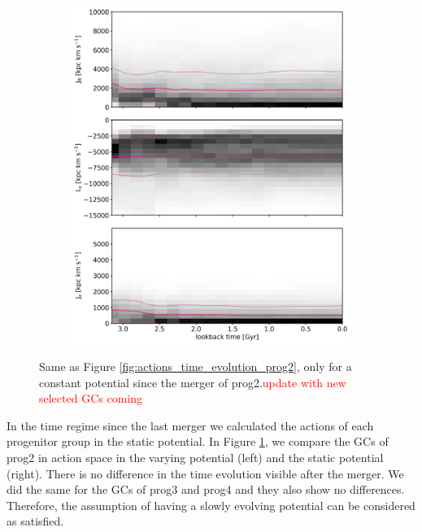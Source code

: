 \begin{figure}[htbp]
\begin{subfigure}[c]{0.48\textwidth}
	    \includegraphics[width=\textwidth]{plots/Dynamics/prog2/action_wodisk_time_evolution_hist_mean_static_pot.png}
    \end{subfigure}
    \caption{Same as Figure \ref{fig:actions_time_evolution_prog2}, only for a constant potential since the merger of prog2.\textcolor{red}{update with new selected GCs coming}}\label{fig:comparison_actions_time_evolution_mean_pot_prog2}
\end{figure}
In the time regime since the last merger we calculated the actions of each progenitor group in the static potential. In Figure \ref{fig:comparison_actions_time_evolution_mean_pot_prog2}, we compare the \acp{GC} of prog2 in action space in the varying potential (left) and the static potential (right). There is no difference in the time evolution visible after the merger. We did the same for the \acp{GC} of prog3 and prog4 and they also show no differences. Therefore, the assumption of having a slowly evolving potential can be considered as satisfied.
\iffalse
